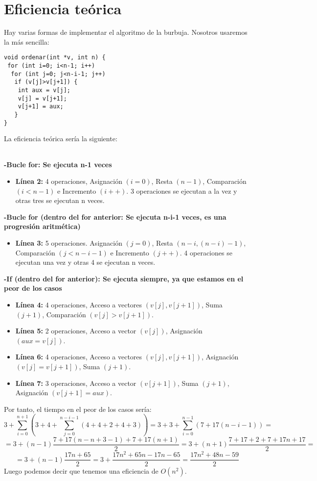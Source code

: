 \documentclass[a4paper,11pt]{article}
\begin{document}
\section{Eficiencia teórica}
Hay varias formas de implementar el algoritmo de la burbuja. Nosotros usaremos la más sencilla:
\lstset{language=C, breaklines=true, basicstyle=\footnotesize}
\begin{lstlisting}[frame=single]
void ordenar(int *v, int n) {
 for (int i=0; i<n-1; i++)
  for (int j=0; j<n-i-1; j++)
   if (v[j]>v[j+1]) {
    int aux = v[j];
    v[j] = v[j+1];
    v[j+1] = aux;
   }
}
\end{lstlisting}
La eficiencia teórica sería la siguiente:\\ \\
\begin{large}
{\bf -Bucle for: Se ejecuta n-1 veces}
\end{large}
\begin{itemize}
\item {\bf Línea 2:} 4 operaciones, Asignación $(i=0)$, Resta $(n-1)$, Comparación $(i<n-1)$ e Incremento $(i++)$. 3 operaciones se ejecutan a la vez y otras tres se ejecutan n veces.
\end{itemize}
\begin{large}
{\bf -Bucle for (dentro del for anterior: Se ejecuta n-i-1 veces, es una progresión aritmética)}
\end{large}
\begin{itemize}
\item {\bf Línea 3:} 5 operaciones. Asignación $(j=0)$, Resta $(n-i,(n-i)-1)$, Comparación $(j<n-i-1)$ e Incremento $(j++)$. 4 operaciones se ejecutan una vez y otras 4 se ejecutan n veces.
\end{itemize}
\begin{large}
{\bf -If (dentro del for anterior): Se ejecuta siempre, ya que estamos en el peor de los casos}
\end{large}
\begin{itemize}
\item {\bf Línea 4:} 4 operaciones, Acceso a vectores $(v[j],v[j+1])$, Suma $(j+1)$, Comparación $(v[j]>v[j+1])$.
\item {\bf Línea 5:} 2 operaciones, Acceso a vector $(v[j])$, Asignación $(aux=v[j])$.
\item {\bf Línea 6:} 4 operaciones, Acceso a vectores $(v[j],v[j+1])$, Asignación $(v[j]=v[j+1])$, Suma $(j+1)$.
\item {\bf Línea 7:} 3 operaciones, Acceso a vector $(v[j+1])$, Suma $(j+1)$, Asignación $(v[j+1]=aux)$. 
\end{itemize}
Por tanto, el tiempo en el peor de los casos sería: 
\begin{displaymath}
3+\sum_{i=0}^{n+1}(3+4+\sum_{j=0}^{n-i-1}(4+4+2+4+3))=3+3+\sum_{i=0}^{n-1}(7+17(n-i-1))=
\end{displaymath}
\begin{displaymath}
=3+(n-1)\frac{7+17(n-n+3-1)+7+17(n+1)}{2}=3+(n+1)\frac{7+17+2+7+17n+17}{2}=
\end{displaymath}
\begin{displaymath}
=3+(n-1)\frac{17n+65}{2}=3+\frac{17n^2+65n-17n-65}{2}=\frac{17n^2+48n-59}{2}
\end{displaymath}
Luego podemos decir que tenemos una eficiencia de $O(n^2)$.
\end{document}
